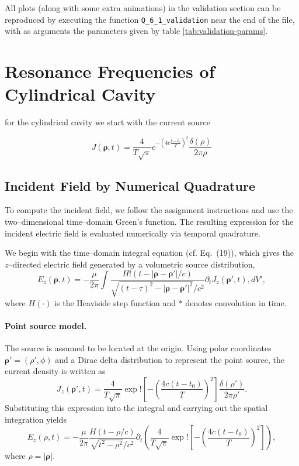 \documentclass{article}
\begin{document}
All plots (along with some extra animations) in the validation section can be reproduced by executing the function \texttt{Q\_6\_1\_validation} near the end of the file,
with as arguments the parameters given by table \ref{tab:validation-params}.


\section{Resonance Frequencies of Cylindrical Cavity}
for the cylindrical cavity we start with the current source 

\begin{equation}
    J(\boldsymbol{\rho},t) = \frac{4}{T\sqrt{\pi}}e^{-(4c\frac{t-t_o}{T})^2}\frac{\delta(\rho)}{2\pi\rho}
\end{equation}

\subsection{Incident Field by Numerical Quadrature}

To compute the incident field, we follow the assignment instructions and use the two--dimensional time--domain Green's function. The resulting expression for the incident electric field is evaluated numerically via temporal quadrature.

We begin with the time--domain integral equation (cf. Eq.~(19)), which gives the $z$--directed electric field generated by a volumetric source distribution, \begin{equation} E_z(\boldsymbol{\rho},t) = -\frac{\mu}{2\pi} \int \frac{H!\left(t-\lvert\boldsymbol{\rho}-\boldsymbol{\rho}'\rvert/c\right)}{\sqrt{(t-\tau)^2-\lvert\boldsymbol{\rho}-\boldsymbol{\rho}'\rvert^2}/c^2}

\partial_t J_z(\boldsymbol{\rho}',t) , dV', \end{equation} where $H(\cdot)$ is the Heaviside step function and $*$ denotes convolution in time.

\paragraph{Point source model.} The source is assumed to be located at the origin. Using polar coordinates $\boldsymbol{\rho}'=(\rho',\phi)$ and a Dirac delta distribution to represent the point source, the current density is written as \begin{equation} J_z(\boldsymbol{\rho}',t) = \frac{4}{T\sqrt{\pi}} \exp!\left[-\left(\frac{4c(t-t_0)}{T}\right)^2\right] \frac{\delta(\rho')}{2\pi\rho'}. \end{equation} Substituting this expression into the integral and carrying out the spatial integration yields \begin{equation} E_z(\rho,t) = -\frac{\mu}{2\pi} \frac{H(t-\rho/c)}{\sqrt{t^2-\rho^2}/c^2}

\partial_t \left( \frac{4}{T\sqrt{\pi}} \exp!\left[-\left(\frac{4c(t-t_0)}{T}\right)^2\right] \right), \end{equation} where $\rho=\lvert\boldsymbol{\rho}\rvert$.
\end{document}
